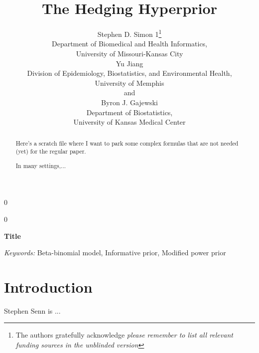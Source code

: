 \documentclass[12pt]{article}
\newcommand{\blind}{0}
\begin{document}
%

\def\spacingset#1{\renewcommand{\baselinestretch}%
{#1}\small\normalsize} \spacingset{1}



\blind
{
  \title{\bf The Hedging Hyperprior}
  \author{Stephen D. Simon 1\thanks{
    The authors gratefully acknowledge \textit{please remember to list all relevant funding sources in the unblinded version}}\hspace{.2cm}\\
    Department of Biomedical and Health Informatics,\\University of Missouri-Kansas City\\
    Yu Jiang\\
    Division of Epidemiology, Biostatistics, and Environmental Health,\\University of Memphis\\
    and \\
    Byron J. Gajewski\\
    Department of Biostatistics,\\University of Kansas Medical Center}
  \maketitle
} \fi

\blind
{
  \bigskip
  \bigskip
  \bigskip
  \begin{center}
    {\LARGE\bf Title}
\end{center}
  \medskip
} \fi

\bigskip
\begin{abstract}

Here's a scratch file where I want to park some complex formulas that are not needed (yet) for the regular paper.

In many settings,...

\end{abstract}

\noindent%
{\it Keywords:}  Beta-binomial model, Informative prior, Modified power prior
\vfill

\newpage
\spacingset{1.45} %
\section{Introduction}
\label{sec:intro}

Stephen Senn is ...
\end{document}
